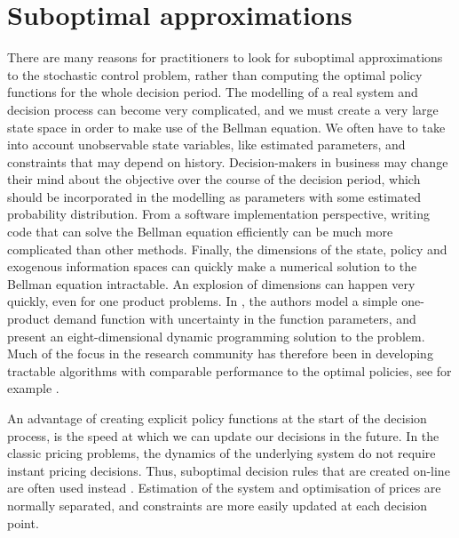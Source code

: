 \documentclass[main.tex]{subfiles}
\begin{document}
\listoftodos

\section{Suboptimal approximations}\label{sec:suboptimal_approximations}
There are many reasons for practitioners to look for suboptimal
approximations to the stochastic control problem, rather than
computing the optimal policy functions for the whole decision period.
The modelling of a real system and decision process can become very
complicated, and  we must  create a very
large state space in order to make use of the Bellman equation.
We often have to take into account unobservable
state variables, like estimated parameters, and constraints that may
depend on history. Decision-makers in business may change their mind
about the objective over the course of the decision period, which should
be incorporated in the modelling as parameters with some estimated
probability distribution.
From a software implementation perspective, writing code that can
solve the Bellman equation efficiently can be much more complicated
than other methods.
Finally, the dimensions of the state, policy and exogenous
information spaces can quickly make a numerical solution to the Bellman
equation intractable. An explosion of dimensions can happen very
quickly, even for one product problems. In
\citep{bertsimas2001dynamic}, the authors model a simple
one-product demand function with uncertainty in the function
parameters, and present an eight-dimensional dynamic programming
solution to the problem.
Much of the focus in the research community has therefore been in
developing tractable algorithms with comparable performance to the
optimal policies, see for example
\citep{powell2011approximate,bertsekas2012dynamic}.

An advantage of creating explicit policy functions at the start of the decision
process, is the speed at which we can update our decisions in the
future. In the classic pricing problems, the dynamics of the
underlying system do not require instant pricing decisions. Thus,
suboptimal decision rules that are created on-line are often used
instead \citep{talluri2006theory}. Estimation of the system and optimisation of prices are
normally separated, and constraints are more easily updated at each
decision point.
\end{document}
